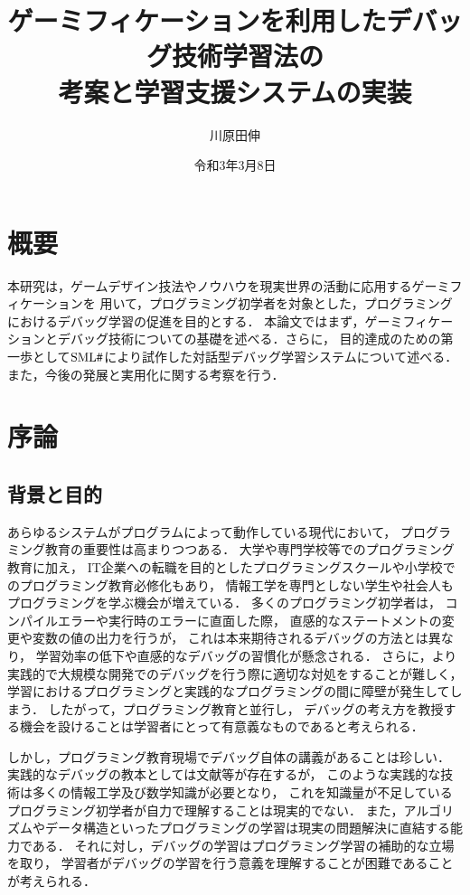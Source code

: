\documentclass{jreport}
\title{ゲーミフィケーションを利用したデバッグ技術学習法の\\考案と学習支援システムの実装}
\author{川原田伸}{B7TB2507}
\date{令和3年3月8日}{令和3年3月}
\newcommand\SMLSharp{$\mbox{SML\fontfamily{ptm}\selectfont\#}$}
\begin{document}
\maketitle


\chapter*{概要}
本研究は，ゲームデザイン技法やノウハウを現実世界の活動に応用するゲーミフィケーションを
用いて，プログラミング初学者を対象とした，プログラミングにおけるデバッグ学習の促進を目的とする．
本論文ではまず，ゲーミフィケーションとデバッグ技術についての基礎を述べる．さらに，
目的達成のための第一歩として\SMLSharp により試作した対話型デバッグ学習システムについて述べる．
また，今後の発展と実用化に関する考察を行う．

\setcounter{tocdepth}{1}
\tableofcontents

\chapter{序論}
\section{背景と目的}
あらゆるシステムがプログラムによって動作している現代において，
プログラミング教育の重要性は高まりつつある．
大学や専門学校等でのプログラミング教育に加え，
IT企業への転職を目的としたプログラミングスクールや小学校でのプログラミング教育必修化もあり，
情報工学を専門としない学生や社会人もプログラミングを学ぶ機会が増えている．
多くのプログラミング初学者は，
コンパイルエラーや実行時のエラーに直面した際，
直感的なステートメントの変更や変数の値の出力を行うが，
これは本来期待されるデバッグの方法とは異なり，
学習効率の低下や直感的なデバッグの習慣化が懸念される．
さらに，より実践的で大規模な開発でのデバッグを行う際に適切な対処をすることが難しく，
学習におけるプログラミングと実践的なプログラミングの間に障壁が発生してしまう．
したがって，プログラミング教育と並行し，
デバッグの考え方を教授する機会を設けることは学習者にとって有意義なものであると考えられる．

しかし，プログラミング教育現場でデバッグ自体の講義があることは珍しい．
実践的なデバッグの教本としては文献\cite{Andreas:Debugging}等が存在するが，
このような実践的な技術は多くの情報工学及び数学知識が必要となり，
これを知識量が不足しているプログラミング初学者が自力で理解することは現実的でない．
また，アルゴリズムやデータ構造といったプログラミングの学習は現実の問題解決に直結する能力である．
それに対し，デバッグの学習はプログラミング学習の補助的な立場を取り，
学習者がデバッグの学習を行う意義を理解することが困難であることが考えられる．
\end{document}
